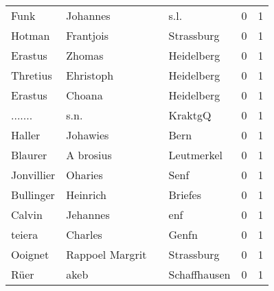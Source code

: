 \begin{tabular}{llllrr}
                     Funk &                           Johannes &             &                                        s.l. &          0 &         1 \\
                   Hotman &                          Frantjois &             &                                  Strassburg &          0 &         1 \\
                  Erastus &                             Zhomas &             &                                  Heidelberg &          0 &         1 \\
                 Thretius &                          Ehristoph &             &                                  Heidelberg &          0 &         1 \\
                  Erastus &                             Choana &             &                                  Heidelberg &          0 &         1 \\
                  ....... &                               s.n. &             &                                     KraktgQ &          0 &         1 \\
                   Haller &                           Johawies &             &                                        Bern &          0 &         1 \\
                  Blaurer &                          A brosius &             &                                  Leutmerkel &          0 &         1 \\
               Jonvillier &                            Oharies &             &                                        Senf &          0 &         1 \\
                Bullinger &                           Heinrich &             &                                     Briefes &          0 &         1 \\
                   Calvin &                           Jehannes &             &                                         enf &          0 &         1 \\
                   teiera &                            Charles &             &                                       Genfn &          0 &         1 \\
                  Ooignet &                    Rappoel Margrit &             &                                  Strassburg &          0 &         1 \\
                     Rüer &                               akeb &             &                                Schaffhausen &          0 &         1 \\

\end{tabular}
